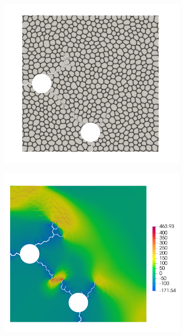 \begin{figure}[htb!]
  \centering
  \begin{subfigure}[t]{0.35\linewidth}
    \centering
    \includegraphics[width=\linewidth]{Chapter3/figures/two_bubbles_bnd}
    \caption{}
  \end{subfigure}
  \begin{subfigure}[t]{0.35\linewidth}
    \centering
    \includegraphics[width=\linewidth]{Chapter3/figures/two_bubbles_stress}
    \caption{}
  \end{subfigure}
  

\end{figure}
